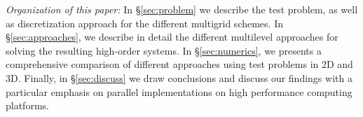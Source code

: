 \documentclass[smallcondensed,final]{svjour3}     %
\newcommand{\gsnote}[1]{\textcolor{blue}{GS: #1}}
\begin{document}

{\em Organization of this paper:} In \S\ref{sec:problem} we describe
the test problem, as well as discretization approach for the different
multigrid schemes. In \S\ref{sec:approaches}, we describe in detail
the different multilevel approaches for solving the resulting
high-order systems. In \S\ref{sec:numerics}, we presents a
comprehensive comparison of different approaches using test problems
in 2D and 3D. Finally, in \S\ref{sec:discuss} we draw conclusions and
discuss our findings with a particular emphasis on parallel
implementations on high performance computing platforms.







\end{document}
